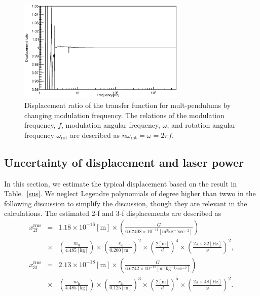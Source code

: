 \documentclass[%
 reprint,
superscriptaddress,
 amsmath,amssymb,
 aps,
]{revtex4-1}
\begin{document}
\begin{figure}
\begin{center}
\includegraphics[width=8cm]{dx_Gcal_ratio.eps}
\caption{Displacement ratio of the transfer function for mult-pendulums by changing modulation frequency. The relations of the modulation frequency, $f$, modulation angular frequency, $\omega$, and rotation angular frequency $\omega_{\mathrm{rot}}$ are described as $n\omega_{\mathrm{rot}}=\omega=2\pi f$. }
\label{fig:ratio}
\end{center}
\end{figure}

\subsection{Uncertainty of displacement and  laser power}
In this section, we estimate the typical displacement based on the result in Table.~\ref{sus}. We neglect Legendre polynomials of degree higher than twwo in the following discussion to simplify the discussion, though they are relevant in the calculations. 
 The estimated 2-f and 3-f displacements are described as
 \footnotesize
\begin{eqnarray}
x^{\mathrm{rms}}_{\mathrm{2f}}&=&1.18 \times 10^{-16}\mathrm{[m]} \times \left( \frac{G}{6.67408 \times 10^{-11} \mathrm{[m^3kg^{-1}sec^{-2}]}} \right) \nonumber \\
&\times&\! \left( \! \frac{m_{\mathrm{q}}}{4.485 \mathrm{[kg]}} \!\right) \! \times \!\left( \!\frac{r_{\mathrm{q}}}{0.200 \mathrm{[m]}} \! \right)^2 \! \times \! \left( \! \frac{2\mathrm{[m]}}{d} \! \right)^4 \! \times \! \left( \! \frac{2\pi \! \times \! 32\mathrm{[Hz]}}{\omega} \! \right)^2,\\
x^{\mathrm{rms}}_{\mathrm{3f}}&=&2.13 \times 10^{-18}\mathrm{[m]} \times \left( \frac{G}{6.6742 \times 10^{-11} \mathrm{[m^3kg^{-1}sec^{-2}]}} \right) \nonumber \\
&\times& \! \left( \! \frac{m_{\mathrm{h}}}{4.485 \mathrm{[kg]}}\! \right) \! \times \! \left(  \!\frac{r_{\mathrm{h}}}{0.125 \mathrm{[m]}} \! \right)^3 
\! \times \! \left(\! \frac{2\mathrm{[m]}}{d} \! \right)^5 \! \times \! \left( \! \frac{2\pi\!\times \! 48\mathrm{[Hz]}}{\omega} \! \right)^2.
\end{eqnarray}
\normalsize
\end{document}
